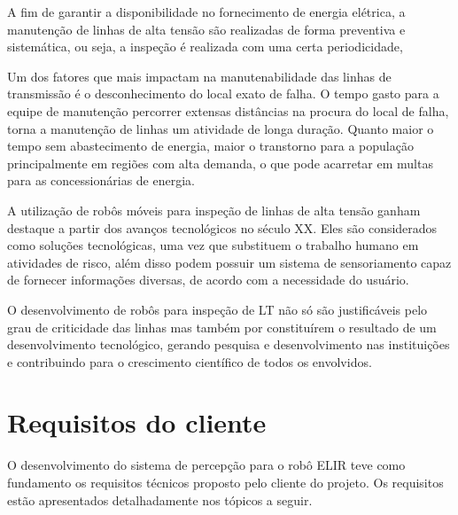 A fim de garantir a disponibilidade no fornecimento de energia elétrica, a manutenção de linhas de alta tensão são realizadas de forma preventiva e sistemática, ou seja, a inspeção é realizada com uma certa periodicidade, %

Um dos fatores que mais impactam na manutenabilidade das linhas de transmissão é o desconhecimento do local exato de falha. O tempo gasto para a equipe de manutenção percorrer extensas distâncias na procura do local de falha, torna a manutenção de linhas um atividade de longa duração. Quanto maior o tempo sem abastecimento de energia, maior o transtorno para a população principalmente em regiões com alta demanda, o que pode acarretar em multas para as concessionárias de energia.

A utilização de robôs móveis para inspeção de linhas de alta tensão ganham destaque a partir dos avanços tecnológicos no século XX. Eles são considerados como soluções tecnológicas, uma vez que substituem o trabalho humano em atividades de risco, além disso podem possuir um sistema de sensoriamento capaz de fornecer informações diversas, de acordo com a necessidade do usuário.

O desenvolvimento de robôs para inspeção de LT não só são justificáveis pelo grau de criticidade das linhas mas também por constituírem o resultado de um desenvolvimento tecnológico, gerando pesquisa e desenvolvimento nas instituições e contribuindo para o crescimento científico de todos os envolvidos.



\section{Requisitos do cliente}
\label{sec:reqc}

O desenvolvimento do sistema de percepção para o robô ELIR teve como fundamento os requisitos técnicos proposto pelo cliente do projeto. Os requisitos estão apresentados detalhadamente nos tópicos a seguir.
    
